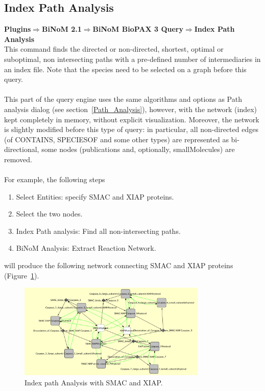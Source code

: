 \parbox{\textwidth}{

\subsection{Index Path Analysis}

\textbf{Plugins$\Rightarrow$BiNoM 2.1$\Rightarrow$BiNoM BioPAX 3 Query$\Rightarrow$Index Path Analysis}\\

This command finds the directed or non-directed, shortest, optimal or
suboptimal, non intersecting paths with a pre-defined number of intermediaries
in an index file. Note that the species need to be selected on a graph before
this query.\\\\
This part of the query engine uses the same algorithms and options as Path
analysis dialog (see section~\ref{Path_Analysis}), however, with the network
(index) kept completely in memory, without explicit visualization. Moreover, the
network is slightly modified before this type of query: in particular, all
non-directed edges (of CONTAINS, SPECIESOF and some other types) are represented
as bi-directional, some nodes (publications and, optionally, smallMolecules) are
removed.\\\\
For example, the following steps

\begin{enumerate}
\item Select Entities: specify SMAC and XIAP proteins.
\item Select the two nodes.
\item Index Path analysis: Find all non-intersecting paths.
\item BiNoM Analysis: Extract Reaction Network.
\end{enumerate}

will produce the following network connecting SMAC and XIAP proteins (Figure~\ref{Index_Path_Analysis}).

}

\begin{figure}
\centering
\includegraphics[width=0.8\textwidth]{graphics/ebo_index_path}
\caption{Index path Analysis with SMAC and XIAP.}
\label{Index_Path_Analysis}
\end{figure}

